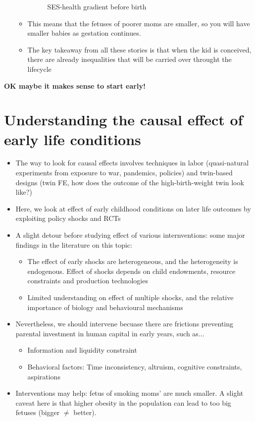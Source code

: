 \begin{itemize}
\begin{itemize}
\begin{figure}[H]
                \caption{SES-health gradient before birth}
                \label{Prebirthgradient}
            \end{figure}
            \item This means that the fetuses of poorer moms are smaller, so you will have smaller babies as gestation continues.
            \item The key takeaway from all these stories is that when the kid is conceived, there are already inequalities that will be carried over throught the lifecycle
        \end{itemize}
    \end{itemize}
    
    \textbf{OK maybe it makes sense to start early!} 


\section{Understanding the causal effect of early life conditions}

    \begin{itemize}
        \item The way to look for causal effects involves techniques in labor (quasi-natural experiments from exposure to war, pandemics, policies) and twin-based designs (twin FE, how does the outcome of the high-birth-weight twin look like?)
        \item Here, we look at effect of early childhood conditions on later life outcomes by  exploiting policy shocks and RCTs
        \item A slight detour before studying effect of various internventions: some major findings in the literature on this topic:
        \begin{itemize}
            \item The effect of early shocks are heterogeneous, and the heterogeneity is endogenous. Effect of shocks depends on child endowments, resource constraints and production technologies
            \item Limited understanding on effect of multiple shocks, and the relative importance of biology and behavioural mechanisms
        \end{itemize}
        \item Nevertheless, we should intervene becuase there are frictions preventing parental investment in human capital in early years, such as...
        \begin{itemize}
            \item Information and liquidity constraint
            \item Behavioral factors: Time inconsistency, altruism, cognitive constraints, aspirations
        \end{itemize}
        \item Interventions may help: fetus of smoking moms' are much smaller. A slight caveat here is that higher obesity in the population can lead to too big fetuses (bigger $\neq$ better).
    \end{itemize}


